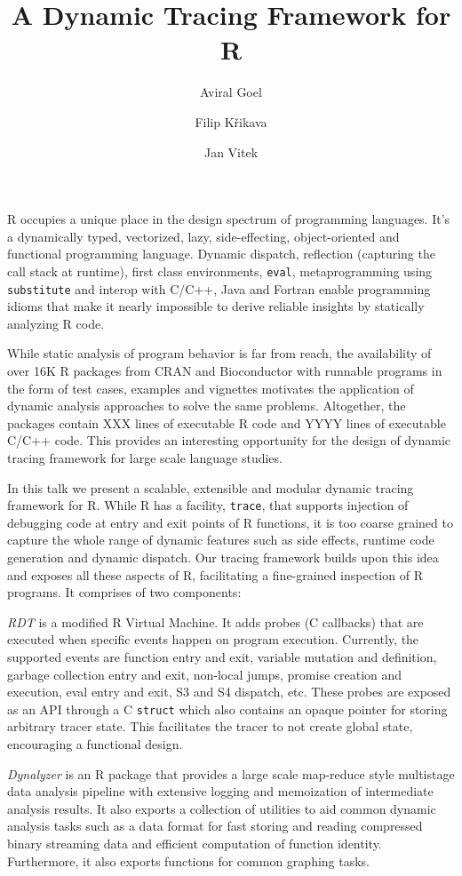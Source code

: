 \documentclass[acmsmall,review]{acmart}
\title{A Dynamic Tracing Framework for R}
\author{Aviral Goel}
\affiliation{
  \institution{Northeastern University}
  \country{USA}
}
\author{Filip Křikava}
\affiliation{
  \institution{Czech Technical University}
  \country{Czechia}
}
\author{Jan Vitek}
\affiliation{
  \institution{Northeastern University}
  \country{USA}
}
\affiliation{
  \institution{Czech Technical University}
  \country{Czechia}
}
\newcommand{\code}[1]{\lstinline|#1|\xspace}
\begin{document}
\maketitle

R occupies a unique place in the design spectrum of programming languages. It’s
a dynamically typed, vectorized, lazy, side-effecting, object-oriented and
functional programming language. Dynamic dispatch, reflection (capturing the
call stack at runtime), first class environments, \code{eval}, metaprogramming
using \code{substitute} and interop with C/C++, Java and Fortran enable programming
idioms that make it nearly impossible to derive reliable insights by
statically analyzing R code.

While static analysis of program behavior is far from reach, the availability of
over 16K R packages from CRAN and Bioconductor with runnable programs in the
form of test cases, examples and vignettes motivates the application of dynamic
analysis approaches to solve the same problems. Altogether, the packages contain
XXX lines of executable R code and YYYY lines of executable C/C++ code. This
provides an interesting opportunity for the design of dynamic tracing framework
for large scale language studies.

In this talk we present a scalable, extensible and modular dynamic tracing
framework for R. While R has a facility, \code{trace}, that supports injection
of debugging code at entry and exit points of R functions, it is too coarse
grained to capture the whole range of dynamic features such as side effects,
runtime code generation and dynamic dispatch. Our tracing framework builds upon
this idea and exposes all these aspects of R, facilitating a fine-grained
inspection of R programs. It comprises of two components:
\begin{compactitem}[$-$]
\item \emph{RDT} is a modified R Virtual Machine. It adds probes (C callbacks)
  that are executed when specific events happen on program execution. Currently,
  the supported events are function entry and exit, variable mutation and
  definition, garbage collection entry and exit, non-local jumps, promise
  creation and execution, eval entry and exit, S3 and S4 dispatch, etc. These
  probes are exposed as an API through a C \code{struct} which also contains
  an opaque pointer for storing arbitrary tracer state. This facilitates the
  tracer to not create global state, encouraging a functional design.
\item \emph{Dynalyzer} is an R package that provides a large scale map-reduce
  style multistage data analysis pipeline with extensive logging and memoization
  of intermediate analysis results. It also exports a collection of utilities to aid
  common dynamic analysis tasks such as a data format for fast storing and
  reading compressed binary streaming data and efficient computation of function
  identity. Furthermore, it also exports functions for common graphing tasks.
\end{compactitem}
\end{document}
